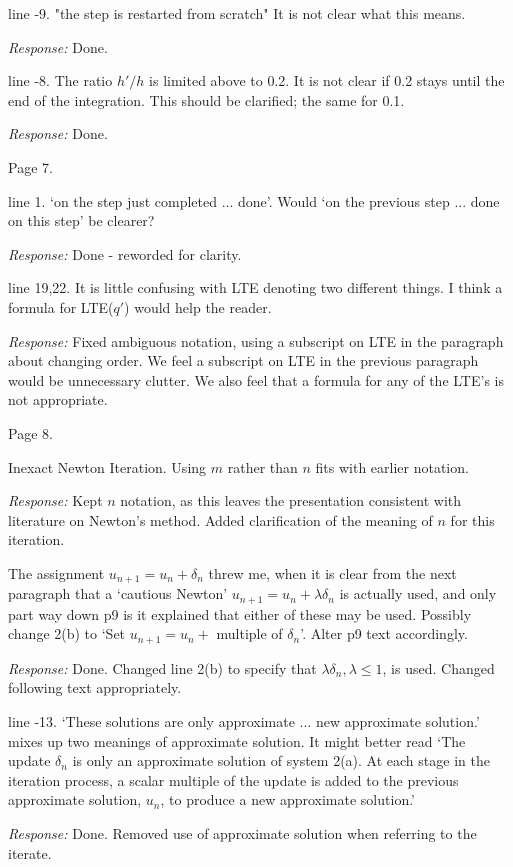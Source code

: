 \documentclass[12pt]{letter}
\begin{document}
line -9. "the step is restarted from scratch" It is not clear what this means.

{\em Response:} Done.

line -8. The ratio $h'/h$ is limited above to 0.2. It is not clear if
0.2 stays until the end of the integration. This should be clarified;
the same for 0.1.

{\em Response:} Done.

Page 7.

line 1. `on the step just completed ... done'. Would `on the previous step ...
done on this step' be clearer?

{\em Response:} Done - reworded for clarity.

line 19,22. It is little confusing with LTE denoting two different things.
I think a formula for LTE($q'$) would help the reader.

{\em Response:} Fixed ambiguous notation, using a subscript on LTE in the
paragraph about changing order.  We feel a subscript on LTE in the previous
paragraph would be unnecessary clutter.  We also feel that a formula for
any of the LTE's is not appropriate.

Page 8.

Inexact Newton Iteration. Using $m$ rather than $n$ fits with earlier
notation.

{\em Response:} Kept $n$ notation, as this leaves the presentation
consistent with literature on Newton's method.  Added
clarification of the meaning of $n$ for this iteration.

The assignment $u_{n+1} = u_n + \delta_n$ threw me, when it is clear
from the next paragraph that a `cautious Newton' $u_{n+1} = u_n +
\lambda\delta_n$ is actually used, and only part way down p9 is it
explained that either of these may be used. Possibly change 2(b) to
`Set $u_{n+1} = u_n + $ multiple of $\delta_n$'. Alter p9 text accordingly.

{\em Response: } Done. Changed line 2(b) to specify that $\lambda
\delta_n, \lambda \leq 1$, is used.  Changed following text
appropriately.

line -13. `These solutions are only approximate ... new approximate
solution.'  mixes up two meanings of approximate solution. It might
better read `The update $\delta_n$ is only an approximate solution of
system 2(a). At each stage in the iteration process, a scalar multiple
of the update is added to the previous approximate solution, $u_n$, to
produce a new approximate solution.'

{\em Response: } Done. Removed use of approximate solution when
referring to the iterate.
\end{document}
